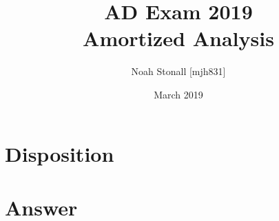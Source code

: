 \documentclass{article}
\title{AD Exam 2019 \\ Amortized Analysis}
\author{Noah Stonall [mjh831]}
\date{March 2019}
\begin{document}
\maketitle

\section*{Disposition}


\section*{Answer}

\end{document}

